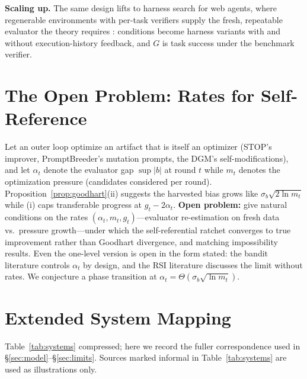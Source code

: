 \documentclass{article}
\theoremstyle{plain}
\theoremstyle{definition}
\theoremstyle{remark}
\begin{document}
\textbf{Scaling up.} The same design lifts to harness search for web agents, where regenerable environments with per-task verifiers supply the fresh, repeatable evaluator the theory requires \citep{zhou2024webarena}: conditions become harness variants with and without execution-history feedback, and $G$ is task success under the benchmark verifier.

\section{The Open Problem: Rates for Self-Reference}
\label{app:open}

Let an outer loop optimize an artifact that is itself an optimizer (STOP's improver, PromptBreeder's mutation prompts, the DGM's self-modifications), and let $\alpha_t$ denote the evaluator gap $\sup |b|$ at round $t$ while $m_t$ denotes the optimization pressure (candidates considered per round). Proposition~\ref{prop:goodhart}(ii) suggests the harvested bias grows like $\sigma_b\sqrt{2 \ln m_t}$ while (i) caps transferable progress at $g_t - 2\alpha_t$. \textbf{Open problem:} give natural conditions on the rates $(\alpha_t, m_t, g_t)$---evaluator re-estimation on fresh data vs.\ pressure growth---under which the self-referential ratchet converges to true improvement rather than Goodhart divergence, and matching impossibility results. Even the one-level version is open in the form stated: the bandit literature controls $\alpha_t$ by design, and the RSI literature \citep{yampolskiy2015seed, chalmers2010singularity, schmidhuber2003godel} discusses the limit without rates. We conjecture a phase transition at $\alpha_t = \Theta(\sigma_b \sqrt{\ln m_t})$.

\section{Extended System Mapping}
\label{app:mapping}

Table~\ref{tab:systems} compressed; here we record the fuller correspondence used in \S\ref{sec:model}--\S\ref{sec:limits}. Sources marked informal in Table~\ref{tab:systems} are used as illustrations only.
\end{document}
